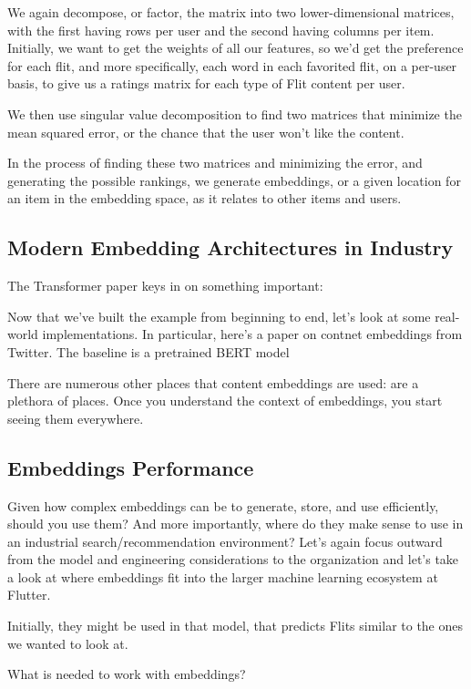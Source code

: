 \documentclass[11pt]{diazessay} %
\begin{document}
We again decompose, or factor, the matrix into two lower-dimensional matrices, with the first having rows per user and the second having columns per item. Initially, we want to get the weights of all our features, so we’d get the preference for each flit, and more specifically, each word in each favorited flit, on a per-user basis, to give us a ratings matrix for each type of Flit content per user. 

We then use singular value decomposition to find two matrices that minimize the mean squared error, or the chance that the user won’t like the content. 

In the process of finding these two matrices and minimizing the error, and generating the possible rankings, we generate embeddings, or a given location for an item in the embedding space, as it relates to other items and users. 

\subsection{Modern Embedding Architectures in Industry}

The Transformer paper keys in on something important: 

Now that we've built the example from beginning to end, let's look at some real-world implementations. In particular, here's a paper on contnet embeddings from Twitter. The baseline is a pretrained BERT model 

There are numerous other places that content embeddings are used: are a plethora of places. Once you understand the context of embeddings, you start seeing them everywhere.  


\subsection{Embeddings Performance}

Given how complex embeddings can be to generate, store, and use efficiently, should you use them? And more importantly, where do they make sense to use in an industrial search/recommendation environment? Let’s again focus outward from the model and engineering considerations to the organization and let's take a look at where embeddings fit into the larger machine learning ecosystem at Flutter. 

Initially, they might be used in that model, that predicts Flits similar to the ones we wanted to look at.  

What is needed to work with embeddings? 
\end{document}
